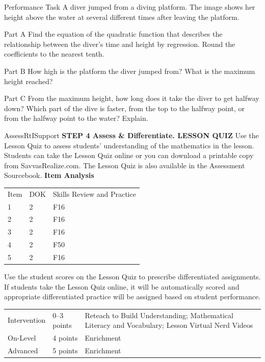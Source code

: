 \documentclass{article}
\newenvironment{practice}[2]{}{}        %
\newenvironment{te-addendum}[2]{}{}     %
\newcommand{\answer}[1]{}               %
\newcommand{\placeholder}[2]{}          %
\newcommand{\te}[1]{}                   %
\begin{document}
\begin{practice}{30}{3}
Performance Task A diver jumped from a diving platform. The image shows her height above the water at several different times after leaving the platform.
\placeholder{illustration}{Diving platform at left above pool. Five successive diver poses along an arc from the high platform down toward the water, with callouts in order: 0.25 s, 27 ft; 0.5 s, 29 ft; 1.5 s, 29 ft; 2.0 s, 25 ft; 2.75 s, 15 ft. Lower platform and ladders visible, trees and hills beyond pool.}
Part A Find the equation of the quadratic function that describes the relationship between the diver's time and height by regression. Round the coefficients to the nearest tenth.
\answer{Part A (y=-5.0x^2+10.2x+24.9)}
Part B How high is the platform the diver jumped from? What is the maximum height reached?
\answer{Part B 24.9 ft; 30.1 ft}
Part C From the maximum height, how long does it take the diver to get halfway down? Which part of the dive is faster, from the top to the halfway point, or from the halfway point to the water? Explain.
\answer{Part C about 2.76 seconds; Diving from the halfway point to the water is faster.}
\te{Printed 2.76 seconds appears to measure time since launch; the prompt asks elapsed time from maximum height, likely about 1.74 seconds using the printed model.}
\end{practice}
\begin{te-addendum}{Assess}{RtISupport}
\textbf{STEP 4 Assess \& Differentiate. LESSON QUIZ}
Use the Lesson Quiz to assess students' understanding of the mathematics in the lesson.
Students can take the Lesson Quiz online or you can download a printable copy from SavvasRealize.com. The Lesson Quiz is also available in the Assessment Sourcebook.
\textbf{Item Analysis}
\begin{tabular}{lll}
Item & DOK & Skills Review and Practice \\
1 & 2 & F16 \\
2 & 2 & F16 \\
3 & 2 & F16 \\
4 & 2 & F50 \\
5 & 2 & F16 \\
\end{tabular}
Use the student scores on the Lesson Quiz to prescribe differentiated assignments.
If students take the Lesson Quiz online, it will be automatically scored and appropriate differentiated practice will be assigned based on student performance.
\begin{tabular}{lll}
Intervention & 0--3 points & Reteach to Build Understanding; Mathematical Literacy and Vocabulary; Lesson Virtual Nerd Videos \\
On-Level & 4 points & Enrichment \\
Advanced & 5 points & Enrichment \\
\end{tabular}
\te{Lesson Quiz is available at SavvasRealize.com. ASSESSMENT RESOURCES.}
\end{te-addendum}
\end{document}
